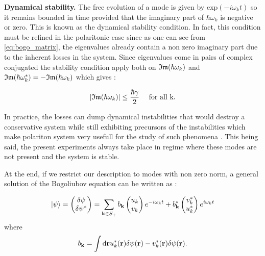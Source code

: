 \bigskip

\textbf{Dynamical stability.} The free evolution of a mode is given by $\mathrm{exp}(-i\omega_k t)$ so it remains 
bounded in time provided that the imaginary part of $\hbar\omega_k$ is negative or zero. This is known as the dynamical stability condition.
In fact, this condition must be refined in the polaritonic case since as one can see from \autoref{eq:bogo_matrix}, the eigenvalues already 
contain a non zero imaginary part due to the inherent losses in the system. Since eigenvalues come in pairs of complex conjugated the stability condition 
apply both on $\mathfrak{Im}{(\hbar\omega_k)}$ and $\mathfrak{Im}{(\hbar\omega_k^*)}=-\mathfrak{Im}{(\hbar\omega_k)}$ which gives :

\begin{equation}
    \abs{\mathfrak{Im}{(\hbar\omega_k)}} \leq \dfrac{\hbar\gamma}{2}   \ \ \ \ \mathrm{for \  all  \  k.}
\end{equation}

In practice, the losses can dump dynamical instabilities that
would destroy a conservative system while still exhibiting precursors of the instabilities which make polariton system very usefull for the study of such phenomena 
\cite{claude_high-resolution_2022}. This being said, the present experiments always take place in regime where these modes are not present and the system is stable. 

\bigskip

At the end, if we restrict our description to modes with non zero norm, a general solution of the Bogoliubov equation can be written as :


\begin{equation}
    \label{eq:general_solution_for_fluctuations_classical}
    \ket{\psi}=
    \begin{pmatrix}
    \delta\psi \\
    \delta\psi^*
    \end{pmatrix} = \sum_{\mathbf{k} \in S_+} b_{\mathbf{k}}
    \begin{pmatrix}
    u_k \\
    v_k
    \end{pmatrix}e^{-i\omega_kt}
    + b^*_{\mathbf{k}}   
     \begin{pmatrix}
        v^*_k \\
        u^*_k
        \end{pmatrix}e^{i\omega_kt}
\end{equation}
where 
\begin{equation}
    b_{\mathbf{k}} = \int \mathrm{d}\mathbf{r} u_k^*(\mathbf{r})\delta\psi(\mathbf{r})-v_k^*(\mathbf{r})\delta\psi(\mathbf{r}). 
\end{equation}

